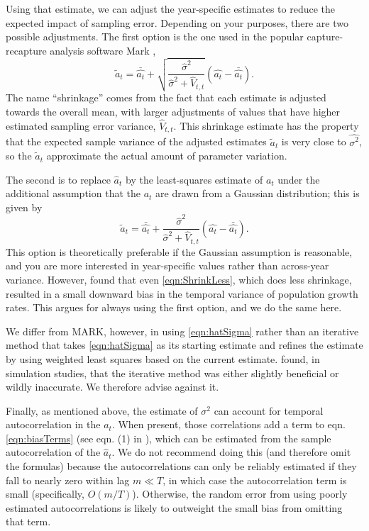 \documentclass[11pt]{article}
\newcommand{\be}{\begin{equation}}
\newcommand{\ee}{\end{equation}}
\begin{document}
{Using that estimate, we can adjust the year-specific estimates to reduce the expected 
impact of sampling error. Depending on your purposes, there are two possible adjustments. 
The first option is the one used in the popular capture-recapture analysis 
software Mark \citet{cooch-white-2020}, 
\be
\widetilde{a}_t = \bar{\hat{a_t}} + \sqrt{\frac{\hat{\sigma}^2}{\hat{\sigma}^2 + \hat{V}_{t,t}}}\left (\hat{a_t} - \bar{\hat{a_t}} \right). 
\label{eqn:ShrinkLess}
\ee
The name ``shrinkage'' comes from the fact that each estimate is adjusted towards the overall mean, with 
larger adjustments of values that have higher estimated sampling error variance, $\hat{V}_{t,t}$. 
This shrinkage estimate has the property that the expected sample variance of the 
adjusted estimates $\widetilde{a}_t$ is very close to $\hat{\sigma^2}$, so the $\widetilde{a}_t$ approximate
the actual amount of parameter variation. 

The second is to replace $\hat{a}_t$ by the least-squares estimate of $a_t$ under the 
additional assumption that the $a_t$ are drawn from a Gaussian distribution; this is given by 
\be
\widetilde{a}_t = \bar{\hat{a_t}} + \frac{\hat{\sigma}^2}{\hat{\sigma}^2 + \hat{V}_{t,t}}\left (\hat{a_t} - \bar{\hat{a_t}} \right). 
\label{eqn:ShrinkMore}
\ee
This option is theoretically preferable if the Gaussian assumption is reasonable, and you are more interested in year-specific values rather 
than across-year variance. However, \citet{metcalf-etal-2015} found that even \eqref{eqn:ShrinkLess}, which does 
less shrinkage, resulted in a small downward bias in the temporal variance of population growth rates. This argues for  
always using the first option, and we do the same here. 

We differ from MARK, however, in using \eqref{eqn:hatSigma} rather than an iterative method that takes \eqref{eqn:hatSigma} as its 
starting estimate and refines the estimate by using weighted least squares based on the current estimate. 
\citet{metcalf-etal-2015} found, in simulation studies, that the iterative method was either slightly beneficial 
or wildly inaccurate. We therefore advise against it. 

Finally, as mentioned above, the estimate of $\sigma^2$ can account for temporal autocorrelation in the $a_t$. 
When present, those correlations add a term to eqn. \eqref{eqn:biasTerms} (see eqn. (1) in \citet{gould-nichols-1998}), 
which can be estimated from the sample autocorrelation of the $\hat{a}_t$. We do not recommend doing this (and therefore omit
the formulas) because the autocorrelations can only be reliably estimated if they fall to nearly zero within lag $m \ll T$, in which
case the autocorrelation term is small (specifically, $O(m/T)$). Otherwise, the random error from using poorly estimated 
autocorrelations is likely to outweight the small bias from omitting that term. 

}
\end{document}
